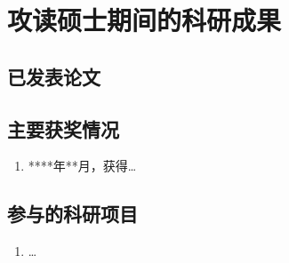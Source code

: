 \chapter{攻读硕士期间的科研成果}

\section*{已发表论文} 
\begin{sloppypar}
\begin{enumerate}
\end{enumerate}
\end{sloppypar}

\section*{主要获奖情况} 
\begin{enumerate}
	\item  ****年**月，获得\dots
\end{enumerate}

\section*{参与的科研项目} 
\begin{enumerate}
	\item  \dots
\end{enumerate}